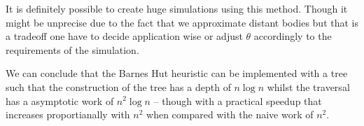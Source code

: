 It is definitely possible to create huge simulations using this method. Though
it might be unprecise due to the fact that we approximate distant bodies but
that is a tradeoff one have to decide application wise or adjust
$\theta$ accordingly to the requirements of the simulation.

We can conclude that the Barnes Hut heuristic can be implemented with a tree
such that the construction of the tree has a depth of $n \log n$ whilst the
traversal has a asymptotic work of $n^2 \log n$ -- though with a practical
speedup that increases proportianally with $n^2$ when compared with the naive
work of $n^2$.
